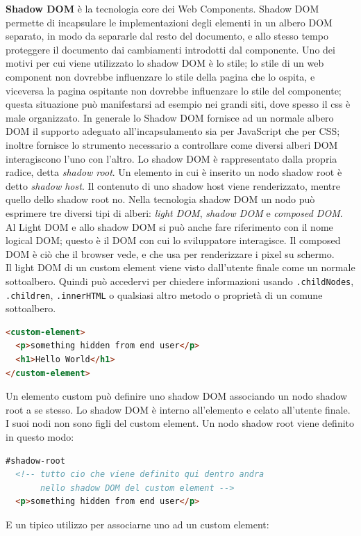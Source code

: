 \textbf{Shadow DOM} è la tecnologia core dei Web Components. Shadow DOM permette di incapsulare le implementazioni degli elementi in un albero DOM separato, in modo da separarle dal resto del documento, e allo stesso tempo proteggere il documento dai cambiamenti introdotti dal componente. Uno dei motivi per cui viene utilizzato lo shadow DOM è lo stile; lo stile di un web component non dovrebbe influenzare lo stile della pagina che lo ospita, e viceversa la pagina ospitante non dovrebbe influenzare lo stile del componente; questa situazione può manifestarsi ad esempio nei grandi siti, dove spesso il css è male organizzato. In generale lo Shadow DOM fornisce ad un normale albero DOM il supporto adeguato all’incapsulamento sia per JavaScript che per CSS; inoltre fornisce lo strumento necessario a controllare come diversi alberi DOM interagiscono l’uno con l’altro. 
Lo shadow DOM è rappresentato dalla propria radice, detta \emph{shadow root}.
Un elemento in cui è inserito un nodo shadow root è detto \emph{shadow host}. Il contenuto di uno shadow host viene renderizzato, mentre quello dello shadow root no. 
Nella tecnologia shadow DOM un nodo può esprimere tre diversi tipi di alberi: \emph{light DOM}, \emph{shadow DOM} e \emph{composed DOM}.
Al Light DOM e allo shadow DOM si può anche fare riferimento con il nome logical DOM; questo è il DOM con cui lo sviluppatore interagisce. Il composed DOM è ciò che il browser vede, e che usa per renderizzare i pixel su schermo.
\\
Il light DOM di un custom element viene visto dall’utente finale come un normale sottoalbero. Quindi può accedervi per chiedere informazioni usando \texttt{.childNodes}, \texttt{.children}, \texttt{.innerHTML} o qualsiasi altro metodo o proprietà di un comune sottoalbero.
\begin{lstlisting}[language=html]
<custom-element>
  <p>something hidden from end user</p>
  <h1>Hello World</h1>
</custom-element>
\end{lstlisting}
Un elemento custom può definire uno shadow DOM associando un nodo shadow root a se stesso. Lo shadow DOM è interno all’elemento e celato all’utente finale. I suoi nodi non sono figli del custom element. Un nodo shadow root viene definito in questo modo:
\begin{lstlisting}[language=html]
#shadow-root
  <!-- tutto cio che viene definito qui dentro andra
  	   nello shadow DOM del custom element -->
  <p>something hidden from end user</p>
\end{lstlisting}
E un tipico utilizzo per associarne uno ad un custom element:
